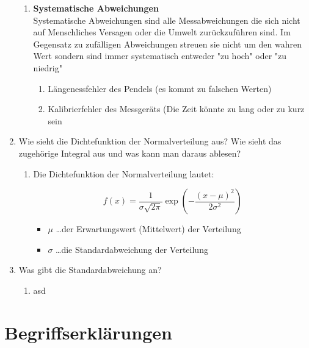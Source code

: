 \documentclass[fleqn,10pt]{olplainarticle}
\begin{document}
\begin{enumerate}
\begin{enumerate}
        \item \textbf{Systematische Abweichungen} \cite{FATU} \\
            Systematische Abweichungen sind alle Messabweichungen die sich nicht auf Menschliches Versagen oder die Umwelt zurückzuführen sind. Im Gegensatz zu zufälligen Abweichungen streuen sie nicht um den wahren Wert sondern sind immer systematisch entweder "zu hoch" oder "zu niedrig"  
            \begin{enumerate}
                \item Längenessfehler des Pendels (es kommt zu falschen Werten)
                \item Kalibrierfehler des Messgeräts (Die Zeit könnte zu lang oder zu kurz sein
            \end{enumerate}
    \end{enumerate}
     \item Wie sieht die Dichtefunktion der Normalverteilung aus? Wie sieht das zugehörige Integral aus und was kann man daraus ablesen? 
     \begin{enumerate}
         \item Die Dichtefunktion der Normalverteilung lautet:
                
                \[
                f(x) = \frac{1}{\sigma \sqrt{2\pi}} \exp \left( - \frac{(x - \mu)^2}{2\sigma^2} \right)
                \]
                    \begin{itemize}
        \item \( \mu \) \dots der Erwartungswert (Mittelwert) der Verteilung
        \item \( \sigma \) \dots die Standardabweichung der Verteilung 
    \end{itemize}
     \end{enumerate}

     \item Was gibt die Standardabweichung an?  
     \begin{enumerate}
         \item asd
     \end{enumerate}
 \end{enumerate}

\section{Begriffserklärungen}



\end{document}
